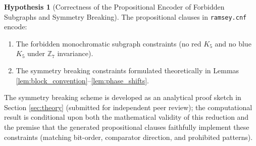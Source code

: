 \documentclass[11pt,a4paper]{article}
\theoremstyle{definition}
\newtheorem{hypothesis}{Hypothesis}
\begin{document}
\begin{hypothesis}[Correctness of the Propositional Encoder of Forbidden Subgraphs and Symmetry Breaking]
The propositional clauses in \texttt{ramsey.cnf} encode:
\begin{enumerate}
    \item The forbidden monochromatic subgraph constraints (no red $K_5$ and no blue $K_5$ under $\mathbb{Z}_7$ invariance).
    \item The symmetry breaking constraints formulated theoretically in Lemmas \ref{lem:block_convention}--\ref{lem:phase_shifts}.
\end{enumerate}
The symmetry breaking scheme is developed as an analytical proof sketch in Section \ref{sec:theory} (submitted for independent peer review); the computational result is conditional upon both the mathematical validity of this reduction and the premise that the generated propositional clauses faithfully implement these constraints (matching bit-order, comparator direction, and prohibited patterns).


\end{hypothesis}
\end{document}
